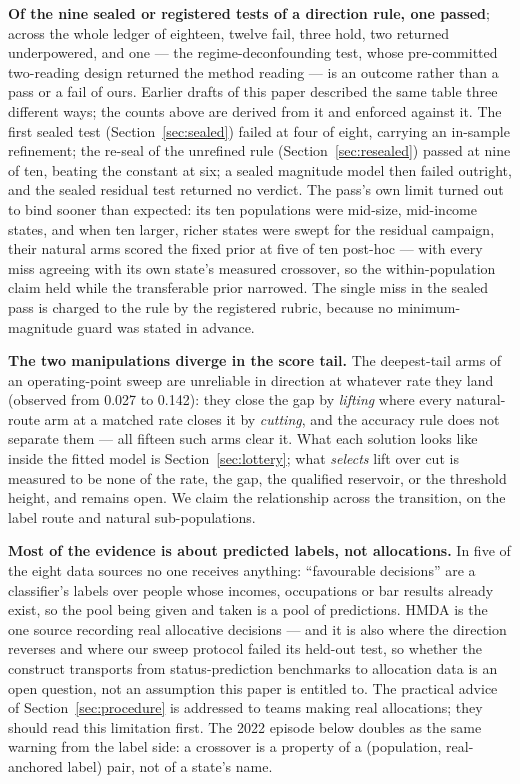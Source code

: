\documentclass[9pt,conference]{IEEEtran}
\begin{document}
\textbf{Of the nine sealed or registered tests of a direction rule, one passed}; across the
whole ledger of eighteen, twelve fail, three hold, two returned underpowered, and one --- the
regime-deconfounding test, whose pre-committed two-reading design returned the method reading
--- is an outcome rather than a pass or a fail of ours. Earlier drafts of this paper described
the same table three different ways; the counts above are derived from it and enforced against
it. The first
sealed test (Section~\ref{sec:sealed}) failed at four of eight, carrying an in-sample
refinement; the re-seal of the unrefined rule (Section~\ref{sec:resealed}) passed at nine of
ten, beating the constant at six; a sealed magnitude model then failed outright, and the
sealed residual test returned no verdict. The pass's own limit turned out to bind sooner
than expected: its ten populations were mid-size, mid-income states, and when ten larger,
richer states were swept for the residual campaign, their natural arms scored the fixed
prior at five of ten post-hoc --- with every miss agreeing with its own state's measured
crossover, so the within-population claim held while the transferable prior narrowed. The
single miss in the sealed pass is charged to the rule by the registered rubric, because no
minimum-magnitude guard was stated in advance.

\textbf{The two manipulations diverge in the score tail.} The deepest-tail arms of an
operating-point sweep are unreliable in direction at whatever rate they land (observed from
0.027 to 0.142): they close the gap by \emph{lifting} where every natural-route arm at a
matched rate closes it by \emph{cutting}, and the accuracy rule does not separate them ---
all fifteen such arms clear it. What each solution looks like inside the fitted model is
Section~\ref{sec:lottery}; what \emph{selects} lift over cut is measured to be none of the
rate, the gap, the qualified reservoir, or the threshold height, and remains open. We claim
the relationship across the transition, on the label route and natural sub-populations.

\textbf{Most of the evidence is about predicted labels, not allocations.} In five of the
eight data sources no one receives anything: ``favourable decisions'' are a classifier's
labels over people whose incomes, occupations or bar results already exist, so the pool
being given and taken is a pool of predictions. HMDA is the one source recording real
allocative decisions --- and it is also where the direction reverses and where our sweep
protocol failed its held-out test, so whether the construct transports from
status-prediction benchmarks to allocation data is an open question, not an assumption
this paper is entitled to. The practical advice of Section~\ref{sec:procedure} is
addressed to teams making real allocations; they should read this limitation first. The
2022 episode below doubles as the same warning from the label side: a crossover is a
property of a (population, real-anchored label) pair, not of a state's name.
\end{document}
